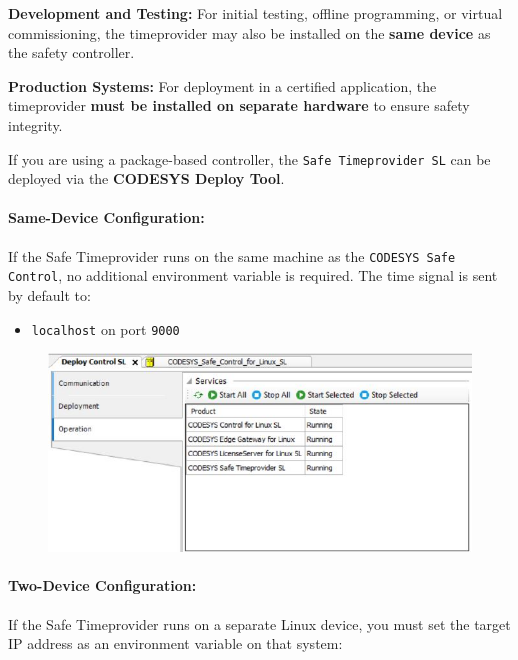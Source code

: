 \documentclass[a4paper,12pt]{article}
\begin{document}
\vspace{0.5em}
\textbf{Development and Testing:}  
For initial testing, offline programming, or virtual commissioning, the timeprovider may also be installed on the \textbf{same device} as the safety controller.

\vspace{0.5em}
\textbf{Production Systems:}  
For deployment in a certified application, the timeprovider \textbf{must be installed on separate hardware} to ensure safety integrity.

\vspace{0.5em}
If you are using a package-based controller, the \texttt{Safe Timeprovider SL} can be deployed via the \textbf{CODESYS Deploy Tool}.

\paragraph{Same-Device Configuration:}  
If the Safe Timeprovider runs on the same machine as the \texttt{CODESYS Safe Control}, no additional environment variable is required. The time signal is sent by default to:

\begin{itemize}
	\item \texttt{localhost} on port \texttt{9000}
\end{itemize}


\begin{figure}[H]
\centering
\includegraphics[width=1\textwidth]{14.JPG}
\end{figure}

\paragraph{Two-Device Configuration:}  
If the Safe Timeprovider runs on a separate Linux device, you must set the target IP address as an environment variable on that system:
\end{document}
